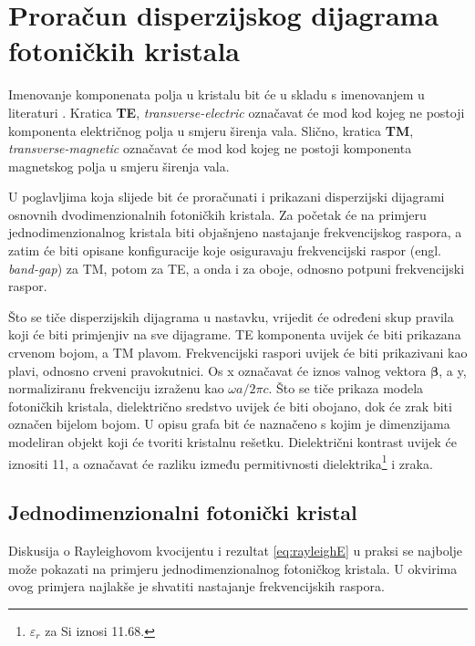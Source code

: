 \documentclass[utf8, seminar, numeric]{fer}
\begin{document}
\chapter{Proračun disperzijskog dijagrama fotoničkih kristala}

Imenovanje komponenata polja u kristalu bit će u skladu s imenovanjem u
literaturi \cite{joannopoulos2011photonic}. Kratica \textbf{TE},
\textit{transverse-electric} označavat će mod kod kojeg ne postoji komponenta
električnog polja u smjeru širenja vala. Slično, kratica \textbf{TM},
\textit{transverse-magnetic} označavat će mod kod kojeg ne postoji komponenta
magnetskog polja u smjeru širenja vala.

U poglavljima koja slijede bit će proračunati i prikazani disperzijski dijagrami
osnovnih dvodimenzionalnih fotoničkih kristala. Za početak će na primjeru
jednodimenzionalnog kristala biti objašnjeno nastajanje frekvencijskog raspora, a
zatim će biti opisane konfiguracije koje osiguravaju frekvencijski raspor (engl.
\textit{band-gap}) za TM, potom za TE, a onda i za oboje, odnosno potpuni
frekvencijski raspor.

Što se tiče disperzijskih dijagrama u nastavku, vrijedit će određeni skup pravila
koji će biti primjenjiv na sve dijagrame. TE komponenta uvijek će biti prikazana
crvenom bojom, a TM plavom. Frekvencijski raspori uvijek će biti prikazivani kao
plavi, odnosno crveni pravokutnici. Os x označavat će iznos valnog vektora
${\bm{\beta}}$, a y, normaliziranu frekvenciju izraženu kao
${\omega a/ 2 \pi c}$. Što se tiče prikaza modela fotoničkih kristala,
dielektrično sredstvo uvijek će biti obojano, dok će zrak biti označen bijelom
bojom. U opisu grafa bit će naznačeno s kojim je dimenzijama modeliran objekt
koji će tvoriti kristalnu rešetku. Dielektrični kontrast uvijek će iznositi 11,
a označavat će razliku između permitivnosti dielektrika\footnote{
$\varepsilon_r$ za Si iznosi 11.68.} i zraka.

\newpage

\section{Jednodimenzionalni fotonički kristal}

Diskusija o Rayleighovom kvocijentu i rezultat \ref{eq:rayleighE} u praksi se
najbolje može pokazati na primjeru jednodimenzionalnog fotoničkog kristala.
U okvirima ovog primjera najlakše je shvatiti nastajanje frekvencijskih raspora.
\end{document}
